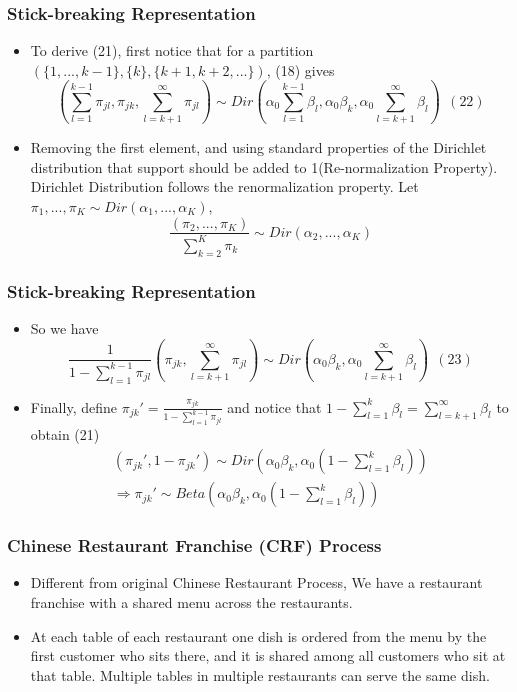 \documentclass{beamer}
\begin{document}
\begin{frame}
    \frametitle{Stick-breaking Representation}
    \begin{itemize}
        \item To derive (21), first notice that for a partition $(\{1,..., k-1\}, \{k\}, \{k+1,k+2,...\})$, (18) gives
$$(\sum_{l=1}^{k-1}\pi_{jl},\pi_{jk},\sum_{l=k+1}^{\infty}\pi_{jl})\sim Dir(\alpha_0\sum_{l=1}^{k-1}\beta_{l},\alpha_0\beta_{k},\alpha_0\sum_{l=k+1}^{\infty}\beta_{l})\ \ (22)$$
        \item Removing the first element, and using standard properties of the Dirichlet distribution that support should be added to 1(Re-normalization Property). Dirichlet Distribution follows the renormalization property. Let $\pi_1,...,\pi_K\sim Dir(\alpha_1,...,\alpha_K)$,
$$\frac{(\pi_2,...,\pi_K)}{\sum_{k=2}^K \pi_k}\sim Dir(\alpha_2,...,\alpha_K)$$
    \end{itemize}
\end{frame}
\begin{frame}
    \frametitle{Stick-breaking Representation}
    \begin{itemize}
        \item So we have
$$\frac{1}{1-\sum_{l=1}^{k-1}\pi_{jl}}(\pi_{jk},\sum_{l=k+1}^{\infty}\pi_{jl})\sim Dir(\alpha_0\beta_{k},\alpha_0\sum_{l=k+1}^{\infty}\beta_{l})\ \ (23)$$
        \item Finally, define $\pi_{jk}'=\frac{\pi_{jk}}{1-\sum_{l=1}^{k-1}\pi_{jl}}$ and notice that $1-\sum_{l=1}^k \beta_l=\sum_{l=k+1}^{\infty}\beta_{l}$ to obtain (21)
$$\begin{aligned}(\pi_{jk}',1-\pi_{jk}')\sim Dir(\alpha_0\beta_{k},\alpha_0(1-\sum_{l=1}^k \beta_l))\\
\Rightarrow \pi_{jk}'\sim Beta(\alpha_0\beta_k,\alpha_0(1-\sum_{l=1}^k \beta_l))\end{aligned}$$
    \end{itemize}
\end{frame}
\begin{frame}
    \frametitle{Chinese Restaurant Franchise (CRF) Process}
    \begin{itemize}
        \item Different from original Chinese Restaurant Process, We have a restaurant franchise with a shared menu across the restaurants. 
        \item At each table of each restaurant one dish is ordered from the menu by the first customer who sits there, and it is shared among all customers who sit at that table. Multiple tables in multiple restaurants can serve the same dish.
    \end{itemize}
\end{frame}
\end{document}

